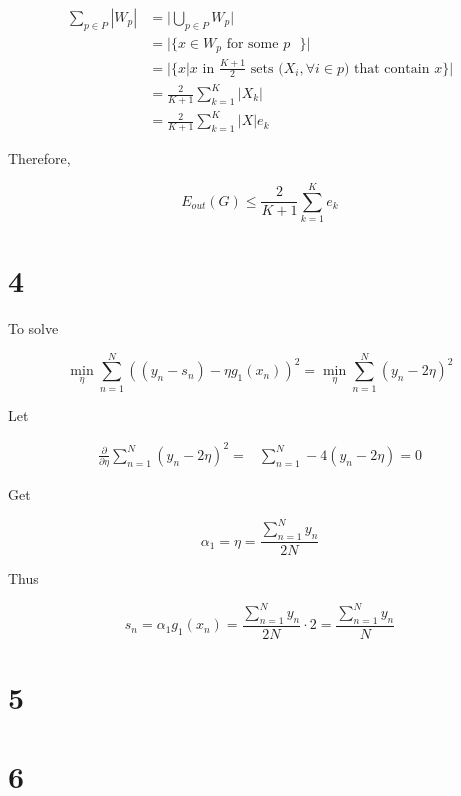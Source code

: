 \documentclass[fleqn,a4paper,12pt]{article}
\begin{document}
\begin{align*}
  \sum_{p \in P} |W_p|
  &= \lvert \bigcup_{p \in P} W_p \rvert \\
  &= \lvert \{ x \in W_p \text{ for some $p$ } \} \rvert \\
  &= \lvert \{ x | \text{$x$ in $\frac{K + 1}{2}$ sets ($X_i, \forall i \in p$) that contain $x$} \} \rvert \\
  &= \frac{2}{K + 1} \sum_{k=1}^{K} |X_k| \\
  &= \frac{2}{K + 1} \sum_{k=1}^{K} |X| e_k
\end{align*}


Therefore,

\begin{equation*}
  E_{out}(G) \leq \frac{2}{K + 1} \sum_{k=1}^{K} e_k
\end{equation*}

\section*{4}

To solve

\begin{equation*}
  \min_{\eta} \sum_{n=1}^N ((y_n - s_n) - \eta g_1(x_n))^2  =   \min_{\eta} \sum_{n=1}^N (y_n - 2 \eta )^2
\end{equation*}

Let

\begin{align*}
  \frac{\partial}{\partial \eta} \sum_{n=1}^N (y_n - 2 \eta)^2 
  =& \sum_{n=1}^N -4 (y_n - 2 \eta) = 0
\end{align*}

Get

\begin{equation*}
  \alpha_1 = \eta = \frac{\sum_{n=1}^N y_n}{2N} 
\end{equation*}

Thus

\begin{equation*}
  s_n = \alpha_1 g_1(x_n) = \frac{\sum_{n=1}^N y_n}{2N} \cdot 2 = \frac{\sum_{n=1}^N y_n}{N}
\end{equation*}

\section*{5}


\section*{6}
\end{document}
